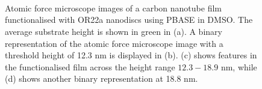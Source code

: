 \documentclass[
  a4paper,
]{scrbook}
\begin{document}
\begin{figure}
\begin{minipage}[t]{0.01\linewidth}
{~

}

\end{minipage}%
%
\begin{minipage}[t]{0.03\linewidth}

{\centering 


}

\end{minipage}%
%
\begin{minipage}[t]{0.01\linewidth}

{\centering 

~

}

\end{minipage}%
%
\begin{minipage}[t]{0.45\linewidth}

{\centering 


}

\end{minipage}%
%
\begin{minipage}[t]{0.01\linewidth}

{\centering 

~

}

\end{minipage}%

\caption{\label{fig-DMSO-AFM-comparison}Atomic force microscope images
of a carbon nanotube film functionalised with OR22a nanodiscs using
PBASE in DMSO. The average substrate height is shown in green in (a). A
binary representation of the atomic force microscope image with a
threshold height of 12.3 nm is displayed in (b). (c) shows features in
the functionalised film across the height range \(12.3-18.9\) nm, while
(d) shows another binary representation at 18.8 nm.}

\end{figure}
\end{document}
